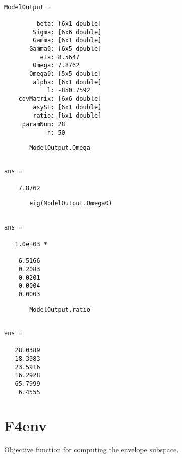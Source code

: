 \documentclass[a4paper,11pt,openany]{memoir}
\begin{document}
        \color{lightgray}\ttfamily \begin{verbatim}

ModelOutput = 

         beta: [6x1 double]
        Sigma: [6x6 double]
        Gamma: [6x1 double]
       Gamma0: [6x5 double]
          eta: 8.5647
        Omega: 7.8762
       Omega0: [5x5 double]
        alpha: [6x1 double]
            l: -850.7592
    covMatrix: [6x6 double]
        asySE: [6x1 double]
        ratio: [6x1 double]
     paramNum: 28
            n: 50
\end{verbatim} \rmfamily
\color{black}
\begin{verbatim}
       ModelOutput.Omega
       \end{verbatim}

        \color{lightgray}\ttfamily \begin{verbatim}

ans =

    7.8762
\end{verbatim} \rmfamily
\color{black}
\begin{verbatim}
       eig(ModelOutput.Omega0)
       \end{verbatim}
        \color{lightgray}\ttfamily \begin{verbatim}

ans =

   1.0e+03 *

    6.5166
    0.2083
    0.0201
    0.0004
    0.0003

\end{verbatim} \rmfamily
\color{black}
\begin{verbatim}
       ModelOutput.ratio
       \end{verbatim}
        \color{lightgray}\ttfamily \begin{verbatim}

ans =

   28.0389
   18.3983
   23.5916
   16.2928
   65.7999
    6.4555

\end{verbatim} \rmfamily
\color{black}

\newpage


\rmfamily
\color{black}\section{F4env}

\begin{par}
Objective function for computing the envelope subspace.
\end{par} \vspace{1em}
\end{document}
